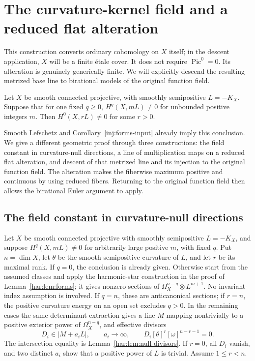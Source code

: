 \section{The curvature-kernel field and a reduced flat alteration}\label{har:sec:alteration}

This construction converts ordinary cohomology on $X$ itself; in the descent application, $X$ will be a finite \'etale cover. It does not require \(\operatorname{Pic}^0=0\).
Its alteration is genuinely generically finite. We will explicitly
descend the resulting metrized base line to birational models of the
original function field.

\begin{theorem}\label{thm:alteration-conversion}
Let $X$ be smooth connected projective, with smoothly semipositive $L=-K_X$. Suppose that for one fixed $q\ge0$, $H^q(X,mL)\ne0$ for unbounded positive integers $m$. Then $H^0(X,rL)\ne0$ for some $r>0$.
\end{theorem}

Smooth Lefschetz and Corollary~\ref{inj:forms-input} already imply this
conclusion. We give a different geometric proof through three
constructions: the field constant in curvature-null directions, a line
of multiplication maps on a reduced flat alteration, and descent of
that metrized line and its injection to the original function field.
The alteration makes the fiberwise maximum positive and continuous by
using reduced fibers. Returning to the original function field then
allows the birational Euler argument to apply.

\subsection{The field constant in curvature-null directions}\label{har:subsec:kernelfield}

Let \(X\) be smooth connected projective with smoothly semipositive
\(L=-K_X\), and suppose \(H^q(X,mL)\ne0\) for arbitrarily large
positive \(m\), with fixed \(q\). Put \(n=\dim X\), let \(\theta\)
be the smooth semipositive curvature of \(L\), and let \(r\) be its
maximal rank. If \(q=0\), the conclusion is already given. Otherwise
start from the assumed classes and apply the harmonic-star construction
in the proof of Lemma~\ref{har:lem:forms}; it gives nonzero sections
of \(\Omega_X^{n-q}\otimes L^{m+1}\). No invariant-index assumption
is involved. If \(q=n\), these are anticanonical sections; if
\(r=n\), the positive curvature energy on an open set excludes
\(q>0\). In the remaining cases the same determinant extraction gives
a line \(M\) mapping nontrivially to a positive exterior power of
\(\Omega_X^{n-q}\), and effective divisors
\[
 D_i\in|M+a_iL|,\qquad a_i\to\infty,
 \qquad D_i[\theta]^r[\omega]^{n-r-1}=0.
\]
The intersection equality is Lemma~\ref{har:lem:null-divisors}.
If \(r=0\), all \(D_i\) vanish, and two distinct \(a_i\) show that
a positive power of \(L\) is trivial. Assume \(1\le r<n\).

